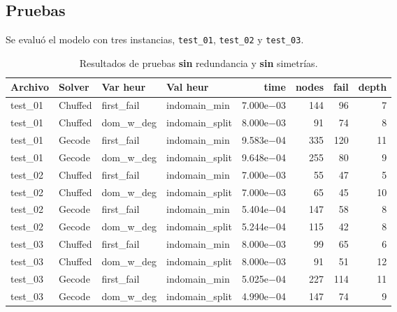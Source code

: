 
\subsection{Pruebas}\label{sec:06-rectangulo-pruebas}
Se evaluó el modelo con tres instancias, \texttt{test\_01}, \texttt{test\_02} y \texttt{test\_03}.

\begin{compactfloats}
\begin{table}[H]
  \centering
  \small
  \setlength{\tabcolsep}{10.8pt}
  \caption{Resultados de pruebas \textbf{sin} redundancia y \textbf{sin} simetrías.}
  \label{tab:pruebas-rectangulo-nosym-nored}
  \begin{tabular}{l l l l r r r r}
    \toprule
    \textbf{Archivo} & \textbf{Solver} & \textbf{Var heur} & \textbf{Val heur} & \textbf{time} & \textbf{nodes} & \textbf{fail} & \textbf{depth} \\
    \midrule
    test\_01 & Chuffed & first\_fail  & indomain\_min   & 7.000e$-$03 & 144 & 96 & 7 \\
    test\_01 & Chuffed & dom\_w\_deg  & indomain\_split & 8.000e$-$03 & 91  & 74 & 8 \\
    test\_01 & Gecode  & first\_fail  & indomain\_min   & 9.583e$-$04 & 335 & 120 & 11 \\
    test\_01 & Gecode  & dom\_w\_deg  & indomain\_split & 9.648e$-$04 & 255 & 80  & 9 \\
    \midrule
    test\_02 & Chuffed & first\_fail  & indomain\_min   & 7.000e$-$03 & 55  & 47 & 5 \\
    test\_02 & Chuffed & dom\_w\_deg  & indomain\_split & 7.000e$-$03 & 65  & 45 & 10 \\
    test\_02 & Gecode  & first\_fail  & indomain\_min   & 5.404e$-$04 & 147 & 58 & 8 \\
    test\_02 & Gecode  & dom\_w\_deg  & indomain\_split & 5.244e$-$04 & 115 & 42 & 8 \\
    \midrule
    test\_03 & Chuffed & first\_fail  & indomain\_min   & 8.000e$-$03 & 99  & 65 & 6 \\
    test\_03 & Chuffed & dom\_w\_deg  & indomain\_split & 8.000e$-$03 & 91  & 51 & 12 \\
    test\_03 & Gecode  & first\_fail  & indomain\_min   & 5.025e$-$04 & 227 & 114 & 11 \\
    test\_03 & Gecode  & dom\_w\_deg  & indomain\_split & 4.990e$-$04 & 147 & 74 & 9 \\
    \bottomrule
  \end{tabular}
\end{table}


\end{compactfloats}
